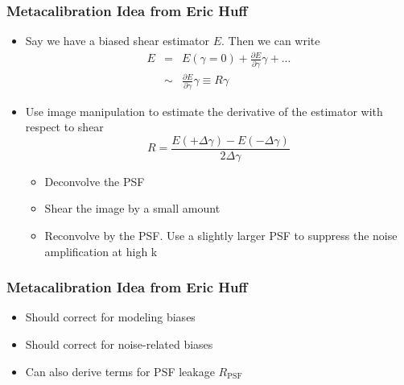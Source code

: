 \documentclass{beamer}
\begin{document}
\frame
{
    \frametitle{Metacalibration Idea from Eric Huff}

 
    \begin{itemize}

        \item Say we have a biased shear estimator $E$.  Then we can write
            {\color{gold}
                \begin{eqnarray}
                    E & = & E(\gamma=0) + \frac{\partial E}{\partial \gamma} \gamma + ... \nonumber \\
                      & \sim &  \frac{\partial E}{\partial \gamma} \gamma \equiv R \gamma \nonumber 
                \end{eqnarray}
            } 
        \item Use image manipulation to estimate the derivative of the
            estimator with respect to shear
            {\color{gold}
                \begin{equation}
                    R = \frac{E(+\Delta\gamma) - E(-\Delta\gamma)}{2 \Delta \gamma} \nonumber 
                \end{equation}
            }
            \begin{itemize}
                \item Deconvolve the PSF
                \item Shear the image by a small amount
                \item Reconvolve by the PSF.  Use a slightly larger PSF to suppress
                    the noise amplification at high k
            \end{itemize}


    \end{itemize}

}

\frame
{
    \frametitle{Metacalibration Idea from Eric Huff}

 
    \begin{itemize}
        
        \item Should correct for modeling biases
        \item Should correct for noise-related biases

        \item Can also derive terms for PSF leakage $R_{\mathrm{PSF}}$

    \end{itemize}

}
\end{document}
